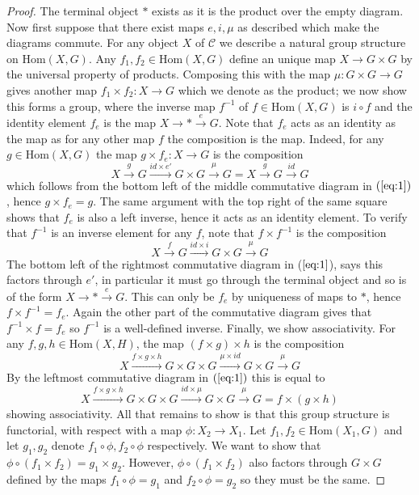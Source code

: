 \documentclass{article}
\theoremstyle{definition}
\theoremstyle{remark}
\theoremstyle{plain}
\newcommand{\mc}[1]{\mathcal{#1}}
\begin{document}
\begin{proof}
	The terminal object $*$ exists as it is the product over the empty diagram. 
	Now first suppose that there exist maps $e, i, \mu$ as described which make the diagrams commute.
	For any object $X$ of $\mc{C}$ we describe a natural group structure on $\text{Hom}(X,G)$.
	Any $f_1, f_2 \in \text{Hom}(X,G)$ define an unique map $X \to G \times G$ by the universal property of products.
	Composing this with the map $\mu: G \times G \to G$ gives another map $f_1 \times f_2: X \to G$ which we denote as the product; we now show this forms a group, where the inverse map $f^{-1}$ of $f \in \text{Hom}(X,G)$ is $i \circ f$ and the identity element $f_e$ is the map $X \to * \xrightarrow{e} G$. \newline
	\indent Note that $f_e$ acts as an identity as the map as for any other map $f$ the composition is the map.
	Indeed, for any $g \in \text{Hom}(X,G)$ the map $g \times f_e: X \to G$ is the composition
	\[X \xrightarrow{g} G \xrightarrow{id \times e'} G \times G \xrightarrow{\mu} G = X \xrightarrow{g} G \xrightarrow{id} G\]
	which follows from the bottom left of the middle commutative diagram in $(\ref{eq:1})$, hence $g \times f_e = g$.
The same argument with the top right of the same square shows that $f_e$ is also a left inverse, hence it acts as an identity element. \newline 
\indent To verify that $f^{-1}$ is an inverse element for any $f$, note that $f \times f^{-1}$ is the composition 
	\[X \xrightarrow{f} G \xrightarrow{id \times i} G \times G \xrightarrow{\mu} G \]
	The bottom left of the rightmost commutative diagram in ($\ref{eq:1}$), says this factors through $e'$, in particular it must go through the terminal object and so is of the form $X \to * \xrightarrow{e} G$.
This can only be $f_e$ by uniqueness of maps to $*$, hence $f \times f^{-1} = f_e$. 
Again the other part of the commutative diagram gives that $f^{-1} \times f = f_e$ so $f^{-1}$ is a well-defined inverse. \newline
	\indent Finally, we show associativity.
For any $f,g,h \in \text{Hom}(X,H)$, the map $(f \times g) \times h$ is the composition 
\[X \xrightarrow{f \times g \times h} G \times G \times G \xrightarrow{\mu \times id} G\times G \xrightarrow{\mu} G\]
By the leftmost commutative diagram in $(\ref{eq:1})$ this is equal to 
\[X \xrightarrow{f \times g \times h} G \times G \times G \xrightarrow{id \times \mu} G\times G \xrightarrow{\mu} G = f \times (g \times h)\]
showing associativity.
All that remains to show is that this group structure is functorial, with respect with a map $\phi: X_2 \to X_1$.
Let $f_1, f_2 \in \text{Hom}(X_1, G)$ and let $g_1, g_2$ denote $f_1 \circ \phi, f_2 \circ \phi$ respectively.
We want to show that $\phi \circ (f_1 \times f_2) = g_1 \times g_2$.
However, $\phi \circ (f_1 \times f_2)$ also factors through $G \times G$ defined by the maps $f_1 \circ \phi = g_1$ and $f_2 \circ \phi = g_2$ so they must be the same. \newline


\end{proof}
\end{document}
